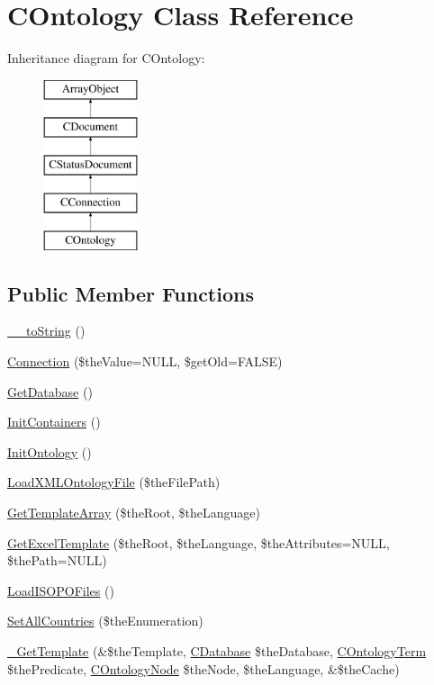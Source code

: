 \hypertarget{class_c_ontology}{\section{C\-Ontology Class Reference}
\label{class_c_ontology}
}
Inheritance diagram for C\-Ontology\-:\begin{figure}[H]
\begin{center}
\leavevmode
\includegraphics[height=5.000000cm]{class_c_ontology}
\end{center}
\end{figure}
\subsection*{Public Member Functions}
\begin{DoxyCompactItemize}
\item 
\hyperlink{class_c_ontology_a3bf6307b3353401050f4e66822d4cecf}{\-\_\-\-\_\-to\-String} ()
\item 
\hyperlink{class_c_ontology_a1c7acc74d753c47dc89d46464afc0099}{Connection} (\$the\-Value=N\-U\-L\-L, \$get\-Old=F\-A\-L\-S\-E)
\item 
\hyperlink{class_c_ontology_ae8905b152a35d927137faeb2aa1885ce}{Get\-Database} ()
\item 
\hyperlink{class_c_ontology_a305fa41da58da8239b7636e0ffdc9689}{Init\-Containers} ()
\item 
\hyperlink{class_c_ontology_a6bfd3100a83783cf1997749bf901b8df}{Init\-Ontology} ()
\item 
\hyperlink{class_c_ontology_ad9b6ebbaf592ab0543be3f63cddd025c}{Load\-X\-M\-L\-Ontology\-File} (\$the\-File\-Path)
\item 
\hyperlink{class_c_ontology_a146da417467dc53827e4b1a2e8646276}{Get\-Template\-Array} (\$the\-Root, \$the\-Language)
\item 
\hyperlink{class_c_ontology_aefcfa505c8f673731b1462bd4989a090}{Get\-Excel\-Template} (\$the\-Root, \$the\-Language, \$the\-Attributes=N\-U\-L\-L, \$the\-Path=N\-U\-L\-L)
\item 
\hyperlink{class_c_ontology_a9789841620a6b75f09120223d7fd4dc8}{Load\-I\-S\-O\-P\-O\-Files} ()
\item 
\hyperlink{class_c_ontology_a85ac5a51432b48fe5c2fa81a6fae2c0a}{Set\-All\-Countries} (\$the\-Enumeration)
\item 
\hyperlink{class_c_ontology_ab00174cd1bb4ddd57457ad5dbc7db4da}{\-\_\-\-Get\-Template} (\&\$the\-Template, \hyperlink{class_c_database}{C\-Database} \$the\-Database, \hyperlink{class_c_ontology_term}{C\-Ontology\-Term} \$the\-Predicate, \hyperlink{class_c_ontology_node}{C\-Ontology\-Node} \$the\-Node, \$the\-Language, \&\$the\-Cache)
\end{DoxyCompactItemize}
